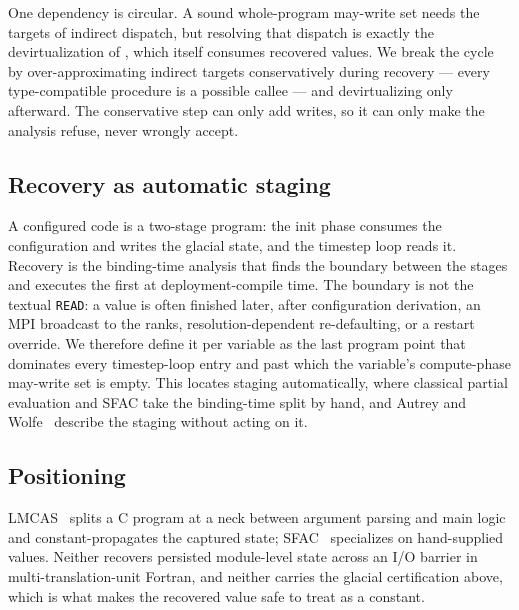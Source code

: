 One dependency is circular. A sound whole-program may-write set needs the targets of indirect dispatch, but resolving that dispatch is exactly the devirtualization of , which itself consumes recovered values. We break the cycle by over-approximating indirect targets conservatively during recovery --- every type-compatible procedure is a possible callee --- and devirtualizing only afterward. The conservative step can only add writes, so it can only make the analysis refuse, never wrongly accept.

\subsection{Recovery as automatic staging}
A configured code is a two-stage program: the init phase consumes the configuration and writes the glacial state, and the timestep loop reads it. Recovery is the binding-time analysis that finds the boundary between the stages and executes the first at deployment-compile time. The boundary is not the textual \lstinline[style=fortran]|READ|: a value is often finished later, after configuration derivation, an MPI broadcast to the ranks, resolution-dependent re-defaulting, or a restart override. We therefore define it per variable as the last program point that dominates every timestep-loop entry and past which the variable's compute-phase may-write set is empty. This locates staging automatically, where classical partial evaluation and SFAC take the binding-time split by hand, and Autrey and Wolfe~\cite{glacial} describe the staging without acting on it.

\subsection{Positioning}
LMCAS~\cite{lmcas} splits a C program at a neck between argument parsing and main logic and constant-propagates the captured state; SFAC~\cite{sfac} specializes on hand-supplied values. Neither recovers persisted module-level state across an I/O barrier in multi-translation-unit Fortran, and neither carries the glacial certification above, which is what makes the recovered value safe to treat as a constant.

